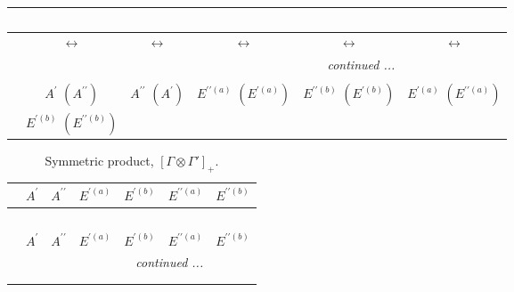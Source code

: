 \documentclass[fleqn,10pt,landscape]{article}
\begin{document}
\begin{itemize}
\begin{center}
\begin{longtable}{cccccc}
\multicolumn{5}{l}{\tablename\ \thetable{}} \\
 \hline \hline
 & $\leftrightarrow$ & $\leftrightarrow$ & $\leftrightarrow$ & $\leftrightarrow$ & $\leftrightarrow$ \\ \hline \endhead

 \hline \hline
\multicolumn{5}{r}{\footnotesize\it continued ...} \\ \endfoot

 \hline \hline
\multicolumn{5}{r}{} \\ \endlastfoot

 & $ A^{\prime}\,\,(A^{\prime\prime}) $ & $ A^{\prime\prime}\,\,(A^{\prime}) $ & $ E^{\prime\prime(a)}\,\,(E^{\prime(a)}) $ & $ E^{\prime\prime(b)}\,\,(E^{\prime(b)}) $ & $ E^{\prime(a)}\,\,(E^{\prime\prime(a)}) $ \\
& $ E^{\prime(b)}\,\,(E^{\prime\prime(b)}) $ & $  $ & $  $ & $  $ & $  $ \\
\end{longtable}
\end{center}
\begin{center}
\renewcommand{\arraystretch}{1.0}
\begin{longtable}{c|cccccc}
\caption{Symmetric product, $[\Gamma\otimes\Gamma']_+.$}
 \\
 \hline \hline
 & $ A^{\prime} $ & $ A^{\prime\prime} $ & $ E^{\prime(a)} $ & $ E^{\prime(b)} $ & $ E^{\prime\prime(a)} $ & $ E^{\prime\prime(b)} $ \\ \hline \endfirsthead

\multicolumn{6}{l}{\tablename\ \thetable{}} \\
 \hline \hline
 & $ A^{\prime} $ & $ A^{\prime\prime} $ & $ E^{\prime(a)} $ & $ E^{\prime(b)} $ & $ E^{\prime\prime(a)} $ & $ E^{\prime\prime(b)} $ \\ \hline \endhead

 \hline \hline
\multicolumn{6}{r}{\footnotesize\it continued ...} \\ \endfoot

 \hline \hline
\multicolumn{6}{r}{} \\ \endlastfoot


\end{longtable}
\end{center}
\end{itemize}
\end{document}
